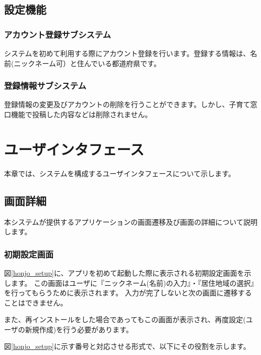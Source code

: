 \documentclass[a4j]{jarticle}
\begin{document}
\subsection{設定機能}
\subsubsection*{アカウント登録サブシステム}
システムを初めて利用する際にアカウント登録を行います。登録する情報は、名前(ニックネーム可）と住んでいる都道府県です。
\subsubsection*{登録情報サブシステム}
登録情報の変更及びアカウントの削除を行うことができます。しかし、子育て窓口機能で投稿した内容などは削除されません。



\newpage
\section{ユーザインタフェース}
本章では、システムを構成するユーザインタフェースについて示します。

\subsection{画面詳細}
本システムが提供するアプリケーションの画面遷移及び画面の詳細について説明します。
\subsubsection{初期設定画面}
図\ref{honjo_setup}に、アプリを初めて起動した際に表示される初期設定画面を示します。
この画面はユーザに『ニックネーム(名前)の入力』・『居住地域の選択』を行ってもらうために表示されます。
入力が完了しないと次の画面に遷移することはできません。

また、再インストールをした場合であってもこの画面が表示され、再度設定(ユーザの新規作成)を行う必要があります。

図\ref{honjo_setup}に示す番号と対応させる形式で、以下にその役割を示します。
\end{document}
